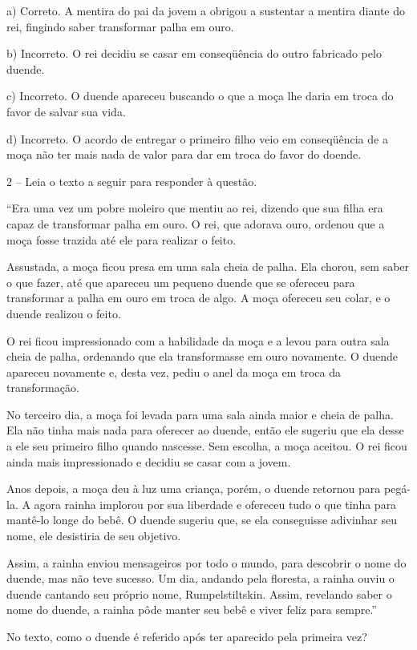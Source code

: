 a) Correto. A mentira do pai da jovem a obrigou a sustentar a mentira
diante do rei, fingindo saber transformar palha em ouro.

b) Incorreto. O rei decidiu se casar em conseqüência do outro fabricado
pelo duende.

c) Incorreto. O duende apareceu buscando o que a moça lhe daria em troca
do favor de salvar sua vida.

d) Incorreto. O acordo de entregar o primeiro filho veio em conseqüência
de a moça não ter mais nada de valor para dar em troca do favor do
doende.

2 -- Leia o texto a seguir para responder à questão.

``Era uma vez um pobre moleiro que mentiu ao rei, dizendo que sua filha
era capaz de transformar palha em ouro. O rei, que adorava ouro, ordenou
que a moça fosse trazida até ele para realizar o feito.

Assustada, a moça ficou presa em uma sala cheia de palha. Ela chorou,
sem saber o que fazer, até que apareceu um pequeno duende que se
ofereceu para transformar a palha em ouro em troca de algo. A moça
ofereceu seu colar, e o duende realizou o feito.

O rei ficou impressionado com a habilidade da moça e a levou para outra
sala cheia de palha, ordenando que ela transformasse em ouro novamente.
O duende apareceu novamente e, desta vez, pediu o anel da moça em troca
da transformação.

No terceiro dia, a moça foi levada para uma sala ainda maior e cheia de
palha. Ela não tinha mais nada para oferecer ao duende, então ele
sugeriu que ela desse a ele seu primeiro filho quando nascesse. Sem
escolha, a moça aceitou. O rei ficou ainda mais impressionado e decidiu
se casar com a jovem.

Anos depois, a moça deu à luz uma criança, porém, o duende retornou para
pegá-la. A agora rainha implorou por sua liberdade e ofereceu tudo o que
tinha para mantê-lo longe do bebê. O duende sugeriu que, se ela
conseguisse adivinhar seu nome, ele desistiria de seu objetivo.

Assim, a rainha enviou mensageiros por todo o mundo, para descobrir o
nome do duende, mas não teve sucesso. Um dia, andando pela floresta, a
rainha ouviu o duende cantando seu próprio nome, Rumpelstiltskin. Assim,
revelando saber o nome do duende, a rainha pôde manter seu bebê e viver
feliz para sempre.''

No texto, como o duende é referido após ter aparecido pela primeira vez?

